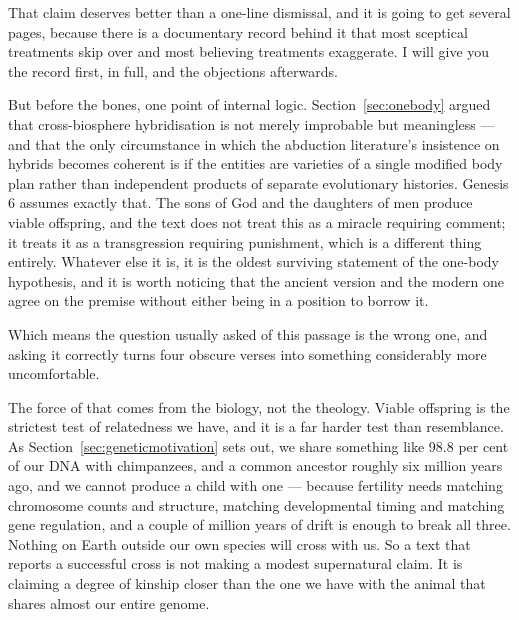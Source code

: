 That claim deserves better than a one-line dismissal, and it is going to get several pages,
because there is a documentary record behind it that most sceptical treatments skip over and
most believing treatments exaggerate. I will give you the record first, in full, and the
objections afterwards.

But before the bones, one point of internal logic. Section~\ref{sec:onebody} argued that
cross-biosphere hybridisation is not merely improbable but meaningless --- and that the only
circumstance in which the abduction literature's insistence on hybrids becomes coherent is if
the entities are varieties of a single modified body plan rather than independent products of
separate evolutionary histories. Genesis 6 assumes exactly that. The sons of God and the
daughters of men produce viable offspring, and the text does not treat this as a miracle
requiring comment; it treats it as a transgression requiring punishment, which is a different
thing entirely. Whatever else it is, it is the oldest surviving statement of the one-body
hypothesis, and it is worth noticing that the ancient version and the modern one agree on the
premise without either being in a position to borrow it.

Which means the question usually asked of this passage is the wrong one, and asking it correctly
turns four obscure verses into something considerably more uncomfortable.


The force of that comes from the biology, not the theology. Viable offspring is the strictest test
of relatedness we have, and it is a far harder test than resemblance. As
Section~\ref{sec:geneticmotivation} sets out, we share something like 98.8 per cent of our DNA with
chimpanzees, and a common ancestor roughly six million years ago, and we cannot produce a child
with one --- because fertility needs matching chromosome counts and structure, matching
developmental timing and matching gene regulation, and a couple of million years of drift is enough
to break all three. Nothing on Earth outside our own species will cross with us. So a text that
reports a successful cross is not making a modest supernatural claim. It is claiming a degree of
kinship closer than the one we have with the animal that shares almost our entire genome.

